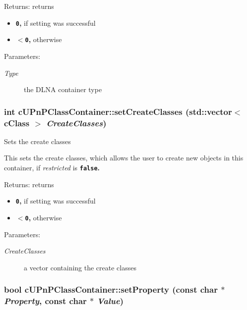 \begin{Desc}
\item[Returns:]returns\begin{itemize}
\item {\bf {\tt 0},} if setting was successful\item {\bf {\tt $<$0},} otherwise \end{itemize}
\end{Desc}
\begin{Desc}
\item[Parameters:]
\begin{description}
\item[{\em Type}]the DLNA container type \end{description}
\end{Desc}
\hypertarget{classcUPnPClassContainer_633b1e47657d9039d0919ce9b139f9b2}{
\subsubsection[{setCreateClasses}]{\setlength{\rightskip}{0pt plus 5cm}int cUPnPClassContainer::setCreateClasses (std::vector$<$ {\bf cClass} $>$ {\em CreateClasses})}}
\label{classcUPnPClassContainer_633b1e47657d9039d0919ce9b139f9b2}


Sets the create classes

This sets the create classes, which allows the user to create new objects in this container, if {\em restricted\/} is {\bf {\tt false}.} 

\begin{Desc}
\item[Returns:]returns\begin{itemize}
\item {\bf {\tt 0},} if setting was successful\item {\bf {\tt $<$0},} otherwise \end{itemize}
\end{Desc}
\begin{Desc}
\item[Parameters:]
\begin{description}
\item[{\em CreateClasses}]a vector containing the create classes \end{description}
\end{Desc}
\hypertarget{classcUPnPClassContainer_488761ebb4f074ded0d5374f862a1b54}{
\subsubsection[{setProperty}]{\setlength{\rightskip}{0pt plus 5cm}bool cUPnPClassContainer::setProperty (const char $\ast$ {\em Property}, \/  const char $\ast$ {\em Value})}}
\label{classcUPnPClassContainer_488761ebb4f074ded0d5374f862a1b54}


